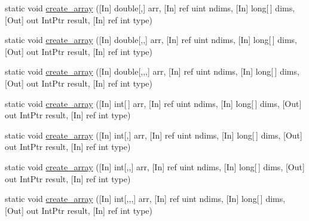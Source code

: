 \begin{DoxyCompactItemize}
\item 
static void \mbox{\hyperlink{classkhiva_1_1interop_1_1_d_l_l_array_a757e5578815a9d722a51b49f192ba142}{create\+\_\+array}} (\mbox{[}In\mbox{]} double\mbox{[},\mbox{]} arr, \mbox{[}In\mbox{]} ref uint ndims, \mbox{[}In\mbox{]} long\mbox{[}$\,$\mbox{]} dims, \mbox{[}Out\mbox{]} out Int\+Ptr result, \mbox{[}In\mbox{]} ref int type)
\item 
static void \mbox{\hyperlink{classkhiva_1_1interop_1_1_d_l_l_array_a3ecf2a802b8625f987063fbecf0a9b9b}{create\+\_\+array}} (\mbox{[}In\mbox{]} double\mbox{[},,\mbox{]} arr, \mbox{[}In\mbox{]} ref uint ndims, \mbox{[}In\mbox{]} long\mbox{[}$\,$\mbox{]} dims, \mbox{[}Out\mbox{]} out Int\+Ptr result, \mbox{[}In\mbox{]} ref int type)
\item 
static void \mbox{\hyperlink{classkhiva_1_1interop_1_1_d_l_l_array_a21c408711bfa6cb46da83f7a0af500b2}{create\+\_\+array}} (\mbox{[}In\mbox{]} double\mbox{[},,,\mbox{]} arr, \mbox{[}In\mbox{]} ref uint ndims, \mbox{[}In\mbox{]} long\mbox{[}$\,$\mbox{]} dims, \mbox{[}Out\mbox{]} out Int\+Ptr result, \mbox{[}In\mbox{]} ref int type)
\item 
static void \mbox{\hyperlink{classkhiva_1_1interop_1_1_d_l_l_array_a1861f2e948c0e30e771c61c8e4337410}{create\+\_\+array}} (\mbox{[}In\mbox{]} int\mbox{[}$\,$\mbox{]} arr, \mbox{[}In\mbox{]} ref uint ndims, \mbox{[}In\mbox{]} long\mbox{[}$\,$\mbox{]} dims, \mbox{[}Out\mbox{]} out Int\+Ptr result, \mbox{[}In\mbox{]} ref int type)
\item 
static void \mbox{\hyperlink{classkhiva_1_1interop_1_1_d_l_l_array_a91edaf7879a63e4cb8915ff491fd8e41}{create\+\_\+array}} (\mbox{[}In\mbox{]} int\mbox{[},\mbox{]} arr, \mbox{[}In\mbox{]} ref uint ndims, \mbox{[}In\mbox{]} long\mbox{[}$\,$\mbox{]} dims, \mbox{[}Out\mbox{]} out Int\+Ptr result, \mbox{[}In\mbox{]} ref int type)
\item 
static void \mbox{\hyperlink{classkhiva_1_1interop_1_1_d_l_l_array_ac766ed81750272e0727c2c19c99530f6}{create\+\_\+array}} (\mbox{[}In\mbox{]} int\mbox{[},,\mbox{]} arr, \mbox{[}In\mbox{]} ref uint ndims, \mbox{[}In\mbox{]} long\mbox{[}$\,$\mbox{]} dims, \mbox{[}Out\mbox{]} out Int\+Ptr result, \mbox{[}In\mbox{]} ref int type)
\item 
static void \mbox{\hyperlink{classkhiva_1_1interop_1_1_d_l_l_array_ac27516813e841d5c684fc6df8ee43094}{create\+\_\+array}} (\mbox{[}In\mbox{]} int\mbox{[},,,\mbox{]} arr, \mbox{[}In\mbox{]} ref uint ndims, \mbox{[}In\mbox{]} long\mbox{[}$\,$\mbox{]} dims, \mbox{[}Out\mbox{]} out Int\+Ptr result, \mbox{[}In\mbox{]} ref int type)

\end{DoxyCompactItemize}
